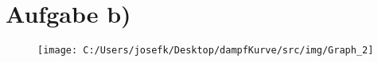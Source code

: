 \section{Aufgabe b)}

\begin{figure}[H]
    \texttt{[image: C:/Users/josefk/Desktop/dampfKurve/src/img/Graph\_2]}
\end{figure}

\clearpage